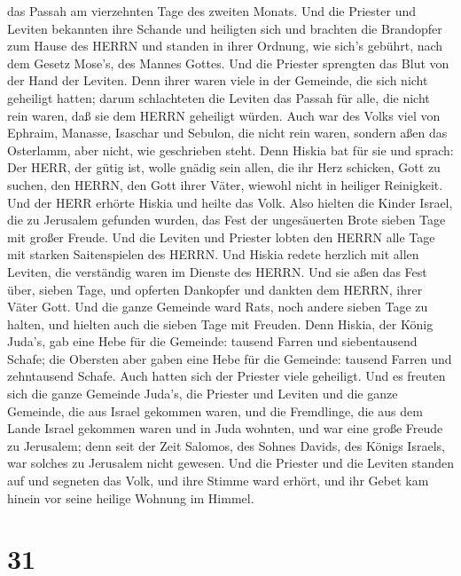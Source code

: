 das Passah am vierzehnten Tage des zweiten Monats. Und die Priester und
Leviten bekannten ihre Schande und heiligten sich und brachten die
Brandopfer zum Hause des HERRN  und standen in ihrer
Ordnung, wie sich's gebührt, nach dem Gesetz Mose's, des Mannes Gottes.
Und die Priester sprengten das Blut von der Hand der Leviten.
 Denn ihrer waren viele in der Gemeinde, die sich nicht
geheiligt hatten; darum schlachteten die Leviten das Passah für alle,
die nicht rein waren, daß sie dem HERRN geheiligt würden. 
Auch war des Volks viel von Ephraim, Manasse, Isaschar und Sebulon, die
nicht rein waren, sondern aßen das Osterlamm, aber nicht, wie
geschrieben steht. Denn Hiskia bat für sie und sprach: Der HERR, der
gütig ist, wolle gnädig sein  allen, die ihr Herz schicken,
Gott zu suchen, den HERRN, den Gott ihrer Väter, wiewohl nicht in
heiliger Reinigkeit.  Und der HERR erhörte Hiskia und
heilte das Volk.  Also hielten die Kinder Israel, die zu
Jerusalem gefunden wurden, das Fest der ungesäuerten Brote sieben Tage
mit großer Freude. Und die Leviten und Priester lobten den HERRN alle
Tage mit starken Saitenspielen des HERRN.  Und Hiskia
redete herzlich mit allen Leviten, die verständig waren im Dienste des
HERRN. Und sie aßen das Fest über, sieben Tage, und opferten Dankopfer
und dankten dem HERRN, ihrer Väter Gott.  Und die ganze
Gemeinde ward Rats, noch andere sieben Tage zu halten, und hielten auch
die sieben Tage mit Freuden.  Denn Hiskia, der König
Juda's, gab eine Hebe für die Gemeinde: tausend Farren und siebentausend
Schafe; die Obersten aber gaben eine Hebe für die Gemeinde: tausend
Farren und zehntausend Schafe. Auch hatten sich der Priester viele
geheiligt.  Und es freuten sich die ganze Gemeinde Juda's,
die Priester und Leviten und die ganze Gemeinde, die aus Israel gekommen
waren, und die Fremdlinge, die aus dem Lande Israel gekommen waren und
in Juda wohnten,  und war eine große Freude zu Jerusalem;
denn seit der Zeit Salomos, des Sohnes Davids, des Königs Israels, war
solches zu Jerusalem nicht gewesen.  Und die Priester und
die Leviten standen auf und segneten das Volk, und ihre Stimme ward
erhört, und ihr Gebet kam hinein vor seine heilige Wohnung im Himmel.

\hypertarget{section-30}{%
\section{31}\label{section-30}}

